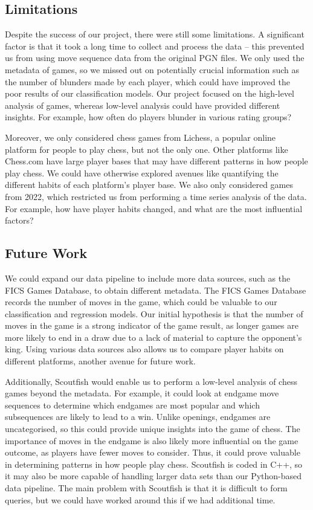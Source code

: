 \documentclass[a4paper, 11pt]{article}
\begin{document}
\subsection{Limitations}
Despite the success of our project, there were still some limitations. A significant factor is that it took a long time to collect and process the data -- this prevented us from using move sequence data from the original PGN files. We only used the metadata of games, so we missed out on potentially crucial information such as the number of blunders made by each player, which could have improved the poor results of our classification models. Our project focused on the high-level analysis of games, whereas low-level analysis could have provided different insights. For example, how often do players blunder in various rating groups?

Moreover, we only considered chess games from Lichess, a popular online platform for people to play chess, but not the only one. Other platforms like Chess.com have large player bases that may have different patterns in how people play chess. We could have otherwise explored avenues like quantifying the different habits of each platform's player base. We also only considered games from 2022, which restricted us from performing a time series analysis of the data. For example, how have player habits changed, and what are the most influential factors?

\subsection{Future Work}
We could expand our data pipeline to include more data sources, such as the FICS Games Database, to obtain different metadata. The FICS Games Database records the number of moves in the game, which could be valuable to our classification and regression models. Our initial hypothesis is that the number of moves in the game is a strong indicator of the game result, as longer games are more likely to end in a draw due to a lack of material to capture the opponent's king. Using various data sources also allows us to compare player habits on different platforms, another avenue for future work.

Additionally, Scoutfish would enable us to perform a low-level analysis of chess games beyond the metadata. For example, it could look at endgame move sequences to determine which endgames are most popular and which subsequences are likely to lead to a win. Unlike openings, endgames are uncategorised, so this could provide unique insights into the game of chess. The importance of moves in the endgame is also likely more influential on the game outcome, as players have fewer moves to consider. Thus, it could prove valuable in determining patterns in how people play chess. Scoutfish is coded in C++, so it may also be more capable of handling larger data sets than our Python-based data pipeline. The main problem with Scoutfish is that it is difficult to form queries, but we could have worked around this if we had additional time.
\end{document}
